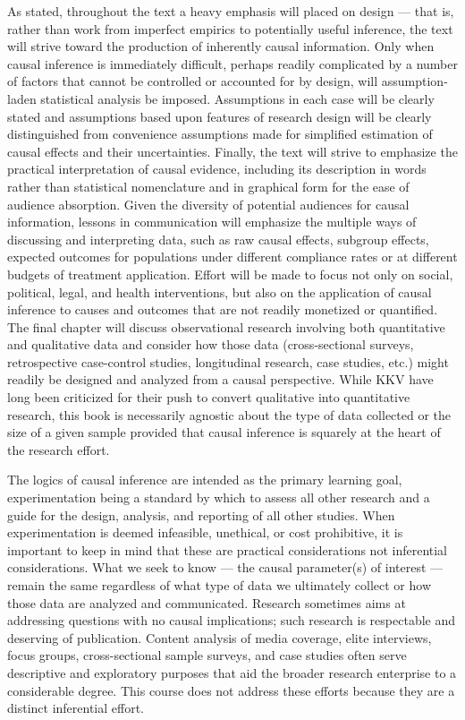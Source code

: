 \documentclass[12pt]{article}
\begin{document}
As stated, throughout the text a heavy emphasis will placed on design --- that is, rather than work from imperfect empirics to potentially useful inference, the text will strive toward the production of inherently causal information. Only when causal inference is immediately difficult, perhaps readily complicated by a number of factors that cannot be controlled or accounted for by design, will assumption-laden statistical analysis be imposed. Assumptions in each case will be clearly stated and assumptions based upon features of research design will be clearly distinguished from convenience assumptions made for simplified estimation of causal effects and their uncertainties. Finally, the text will strive to emphasize the practical interpretation of causal evidence, including its description in words rather than statistical nomenclature and in graphical form for the ease of audience absorption. Given the diversity of potential audiences for causal information, lessons in communication will emphasize the multiple ways of discussing and interpreting data, such as raw causal effects, subgroup effects, expected outcomes for populations under different compliance rates or at different budgets of treatment application. Effort will be made to focus not only on social, political, legal, and health interventions, but also on the application of causal inference to causes and outcomes that are not readily monetized or quantified. The final chapter will discuss observational research involving both quantitative and qualitative data and consider how those data (cross-sectional surveys, retrospective case-control studies, longitudinal research, case studies, etc.) might readily be designed and analyzed from a causal perspective. While KKV have long been criticized for their push to convert qualitative into quantitative research, this book is necessarily agnostic about the type of data collected or the size of a given sample provided that causal inference is squarely at the heart of the research effort.

The logics of causal inference are intended as the primary learning goal, experimentation being a standard by which to assess all other research and a guide for the design, analysis, and reporting of all other studies. When experimentation is deemed infeasible, unethical, or cost prohibitive, it is important to keep in mind that these are practical considerations not inferential considerations. What we seek to know --- the causal parameter(s) of interest --- remain the same regardless of what type of data we ultimately collect or how those data are analyzed and communicated. Research sometimes aims at addressing questions with no causal implications; such research is respectable and deserving of publication. Content analysis of media coverage, elite interviews, focus groups, cross-sectional sample surveys, and case studies often serve descriptive and exploratory purposes that aid the broader research enterprise to a considerable degree. This course does not address these efforts because they are a distinct inferential effort.
\end{document}
